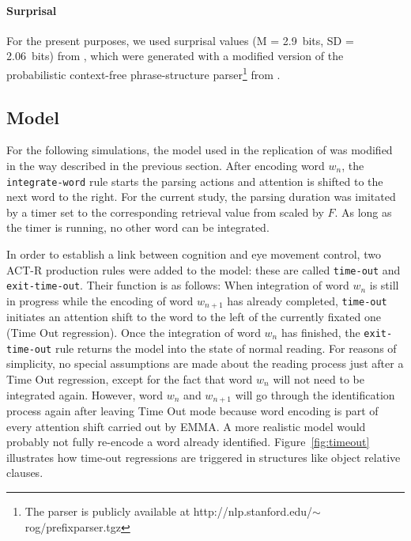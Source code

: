 \paragraph{Surprisal}
For the present purposes, we used surprisal values (M = 2.9~bits, SD = 2.06~bits) from \cite{Boston2008}, which were generated with a modified version of the probabilistic context-free phrase-structure parser\footnote{The parser is publicly available at http://nlp.stanford.edu/$\sim$rog/prefixparser.tgz} from \cite{Levy2008}.

\subsection{Model}
For the following simulations, the model used in the replication of \cite{Salvucci2001} was modified in the way described in the previous section.  
After encoding word $w_n$, the \texttt{integrate-word} rule starts the parsing actions and attention is shifted to the next word to the right.  For the current study, the parsing duration was imitated by a timer set to the corresponding retrieval value from \cite{Boston2008} scaled by $F$.  As long as the timer is running, no other word can be integrated.

In order to establish a link between cognition and eye movement control, two ACT-R production rules were added to the model: these are called \texttt{time-out} and  \texttt{exit-time-out}.  Their function is as follows: When integration of word $w_n$ is still in progress while the encoding of word $w_{n+1}$ has already completed, \texttt{time-out} initiates an attention shift to the word to the left of the currently fixated one  (Time Out regression).  Once the integration of word $w_n$ has finished, the \texttt{exit-time-out} rule returns the model into the state of normal reading.
For reasons of simplicity, no special assumptions are made about the reading process just after a Time Out regression, except for the fact that word $w_n$ will not need to be integrated again.  However, word $w_{n}$ and $w_{n+1}$ will go through the identification process again after leaving Time Out mode because word encoding is part of every attention shift carried out by EMMA.  A more realistic model would probably not fully re-encode a word already identified.  Figure~\ref{fig:timeout} illustrates how time-out regressions are triggered in structures like object relative clauses.

